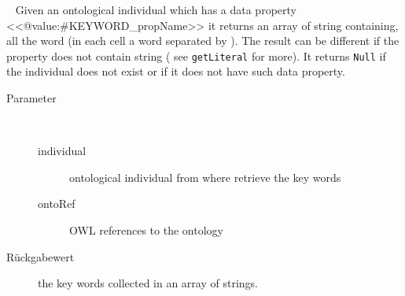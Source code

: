 \begin{description}
~ Given an ontological individual which has a data property <<@value:#KEYWORD_propName>>
 it returns an array of string containing, all the word (in each
 cell a word separated by \textquotedbl  \textquotedbl ). The result can be different if the property
 does not contain string ( see \texttt{getLiteral} for more).
 It returns \verb!Null! if the individual does not exist or if
 it does not have such data property.
\begin{description}
\item[Parameter] ~
\begin{description}
\item[individual]
ontological individual from where retrieve the key words
\item[ontoRef]
OWL references to the ontology
\end{description}
\item[Rückgabewert] 
the key words collected in an array of strings.
\end{description}
\end{description}
